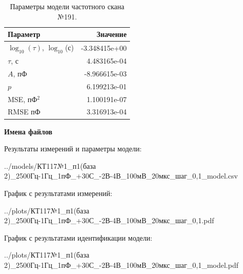 \begin{table}[!ht]
    \centering
    \caption{Параметры модели частотного скана №191.}
    \begin{tabular}{|l|r|}
        \hline
        Параметр                                       & Значение                  \\ \hline
        $\log_{10}(\tau)$, $\log_{10}$(с)              & -3.348415e+00             \\ \hline
        $\tau$, с                                      & 4.483165e-04              \\ \hline
        $A$, пФ                                        & -8.966615e-03             \\ \hline
        $p$                                            & 6.199213e-01              \\ \hline
        MSE, пФ$^2$                                    & 1.100191e-07              \\ \hline
        RMSE пФ                                        & 3.316913e-04              \\ \hline
    \end{tabular}
    \label{table:frequency_scan_model_191}
\end{table}

\textbf{Имена файлов}

Результаты измерений и параметры модели:

\scriptsize../models/КТ117№1\_п1(база 2)\_2500Гц-1Гц\_1пФ\_+30С\_-2В-4В\_100мВ\_20мкс\_шаг\_0,1\_model.csv
\normalsize

График с результатами измерений:

\scriptsize../plots/КТ117№1\_п1(база 2)\_2500Гц-1Гц\_1пФ\_+30С\_-2В-4В\_100мВ\_20мкс\_шаг\_0,1.pdf
\normalsize

График с результатами идентификации модели:

\scriptsize../plots/КТ117№1\_п1(база 2)\_2500Гц-1Гц\_1пФ\_+30С\_-2В-4В\_100мВ\_20мкс\_шаг\_0,1\_model.pdf
\normalsize

